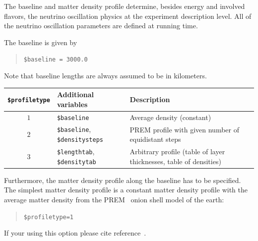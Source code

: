 The baseline and matter density profile determine, besides energy and
involved flavors, the neutrino oscillation physics at the experiment
description level. All of the neutrino oscillation parameters are defined at running time.

The baseline is given by
\begin{quote}
{\tt \$baseline = 3000.0 }
\end{quote}
Note that baseline lengths are always assumed to be in
kilometers.

\begin{table}[t!]
\begin{tabular}{|clp{7cm}|}
\hline
{\tt \$profiletype} & Additional variables & Description \\ 
\hline
$1$ & {\tt \$baseline} & Average density (constant) \\
$2$ & {\tt \$baseline}, {\tt \$densitysteps} & PREM profile with given number of equidistant steps \\
$3$ & {\tt \$lengthtab},  {\tt \$densitytab} & Arbitrary profile (table of layer thicknesses, table of densities) \\
\hline
\end{tabular}
\end{table}


Furthermore, the matter density profile along the baseline
has to be specified. The simplest matter density profile is a constant matter density profile with the average matter density from the PREM~\cite{Stacey} onion shell model of the earth:
\begin{quote}
{\tt \$profiletype=1 }
\end{quote}
%
If your using this option please cite reference~\cite{Stacey}.

